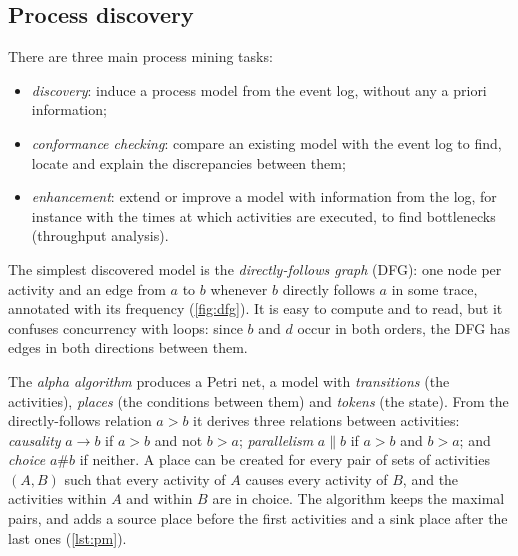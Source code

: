 \subsection{Process discovery\extsec}

There are three main process mining tasks:
\begin{itemize}
  \item \emph{discovery}: induce a process model from the event log, without any a priori information;
  \item \emph{conformance checking}: compare an existing model with the event log to find, locate and
        explain the discrepancies between them;
  \item \emph{enhancement}: extend or improve a model with information from the log, for instance with
        the times at which activities are executed, to find bottlenecks (throughput analysis).
\end{itemize}
The simplest discovered model is the \emph{directly-follows graph} (DFG): one node per activity and an
edge from $a$ to $b$ whenever $b$ directly follows $a$ in some trace, annotated with its frequency
(\cref{fig:dfg}). It is easy to compute and to read, but it confuses concurrency with loops: since $b$
and $d$ occur in both orders, the DFG has edges in both directions between them.

The \emph{alpha algorithm} \citep{vanderaalst2004workflow} produces a Petri net, a model
with \emph{transitions} (the activities), \emph{places} (the conditions between them) and \emph{tokens}
(the state). From the directly-follows relation $a>b$ it derives three relations between activities:
\emph{causality} $a\rightarrow b$ if $a>b$ and not $b>a$; \emph{parallelism} $a\parallel b$ if $a>b$ and
$b>a$; and \emph{choice} $a\#b$ if neither. A place can be created for every pair of sets of activities $(A,B)$ such that every
activity of $A$ causes every activity of $B$, and the activities within $A$ and within $B$ are in choice. The algorithm keeps the maximal pairs, and adds a source place before the first
activities and a sink place after the last ones (\cref{lst:pm}).

